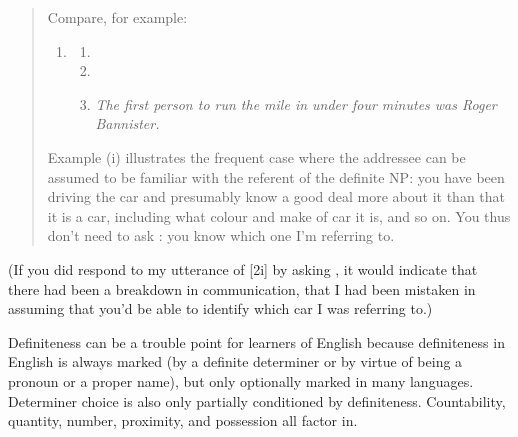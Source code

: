 \begin{quote}
    Compare, for example:
    \begin{enumerate}[noitemsep]
        \item 
        \begin{enumerate}[noitemsep]
            \item {}
            \item {}
            \item \textit{The first person to run the mile in under four minutes was Roger Bannister.}
        \end{enumerate}
    \end{enumerate}
    Example (i) illustrates the frequent case where the addressee can be assumed to be familiar with the referent of the definite NP: you have been driving the car and presumably know a good deal more about it than that it is a car, including what colour and make of car it is, and so on. You thus don't need to ask : you know which one I'm referring to. \\\hfill\citep[368]{Huddleston2002}
\end{quote}

\noindent(If you did respond to my utterance of [2i] by asking , it would indicate that there had been a breakdown in communication, that I had been mistaken in assuming that you'd be able to identify which car I was referring to.)

Definiteness can be a trouble point for learners of English because definiteness in English is always marked (by a definite determiner or by virtue of being a pronoun or a proper name), but only optionally marked in many languages. Determiner choice is also only partially conditioned by definiteness. Countability, quantity, number, proximity, and possession all factor in.


